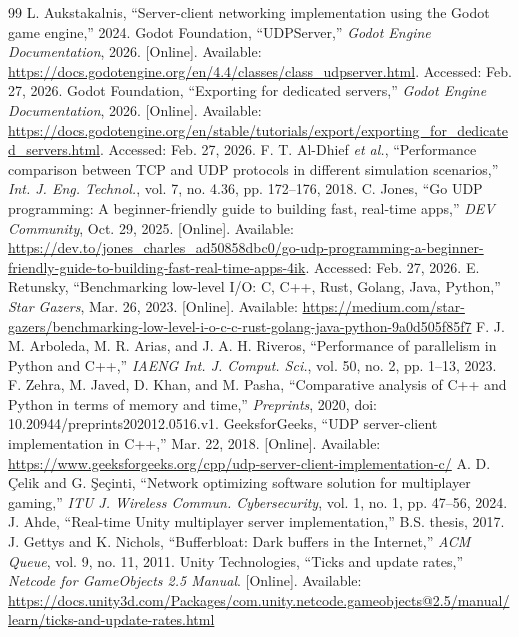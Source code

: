 \IfFileExists{IEEEtran.cls}{\ieeetrue\documentclass[conference]{IEEEtran}}{\ieeefalse\documentclass[twocolumn,10pt]{article}}
\begin{document}
\begin{thebibliography}{99}
 L. Aukstakalnis, ``Server-client networking implementation using the Godot game engine,'' 2024.
 Godot Foundation, ``UDPServer,'' \emph{Godot Engine Documentation}, 2026. [Online]. Available: \url{https://docs.godotengine.org/en/4.4/classes/class_udpserver.html}. Accessed: Feb. 27, 2026.
 Godot Foundation, ``Exporting for dedicated servers,'' \emph{Godot Engine Documentation}, 2026. [Online]. Available: \url{https://docs.godotengine.org/en/stable/tutorials/export/exporting_for_dedicated_servers.html}. Accessed: Feb. 27, 2026.
 F. T. Al-Dhief \emph{et al.}, ``Performance comparison between TCP and UDP protocols in different simulation scenarios,'' \emph{Int. J. Eng. Technol.}, vol. 7, no. 4.36, pp. 172--176, 2018.
 C. Jones, ``Go UDP programming: A beginner-friendly guide to building fast, real-time apps,'' \emph{DEV Community}, Oct. 29, 2025. [Online]. Available: \url{https://dev.to/jones_charles_ad50858dbc0/go-udp-programming-a-beginner-friendly-guide-to-building-fast-real-time-apps-4ik}. Accessed: Feb. 27, 2026.
 E. Retunsky, ``Benchmarking low-level I/O: C, C++, Rust, Golang, Java, Python,'' \emph{Star Gazers}, Mar. 26, 2023. [Online]. Available: \url{https://medium.com/star-gazers/benchmarking-low-level-i-o-c-c-rust-golang-java-python-9a0d505f85f7}
 F. J. M. Arboleda, M. R. Arias, and J. A. H. Riveros, ``Performance of parallelism in Python and C++,'' \emph{IAENG Int. J. Comput. Sci.}, vol. 50, no. 2, pp. 1--13, 2023.
 F. Zehra, M. Javed, D. Khan, and M. Pasha, ``Comparative analysis of C++ and Python in terms of memory and time,'' \emph{Preprints}, 2020, doi: 10.20944/preprints202012.0516.v1.
 GeeksforGeeks, ``UDP server-client implementation in C++,'' Mar. 22, 2018. [Online]. Available: \url{https://www.geeksforgeeks.org/cpp/udp-server-client-implementation-c/}
 A. D. \c{C}elik and G. \c{S}e\c{c}inti, ``Network optimizing software solution for multiplayer gaming,'' \emph{ITU J. Wireless Commun. Cybersecurity}, vol. 1, no. 1, pp. 47--56, 2024.
 J. Ahde, ``Real-time Unity multiplayer server implementation,'' B.S. thesis, 2017.
 J. Gettys and K. Nichols, ``Bufferbloat: Dark buffers in the Internet,'' \emph{ACM Queue}, vol. 9, no. 11, 2011.
 Unity Technologies, ``Ticks and update rates,'' \emph{Netcode for GameObjects 2.5 Manual}. [Online]. Available: \url{https://docs.unity3d.com/Packages/com.unity.netcode.gameobjects@2.5/manual/learn/ticks-and-update-rates.html}

\end{thebibliography}
\end{document}
